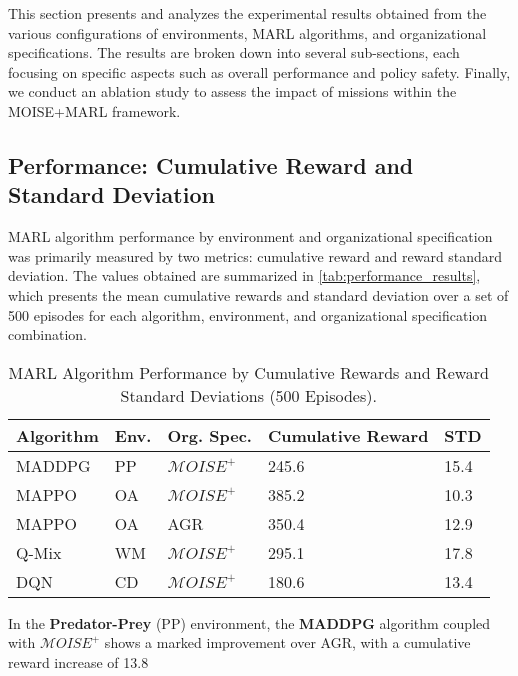 \documentclass[sigconf,anonymous]{aamas}
\begin{document}
This section presents and analyzes the experimental results obtained from the various configurations of environments, MARL algorithms, and organizational specifications. The results are broken down into several sub-sections, each focusing on specific aspects such as overall performance and policy safety. Finally, we conduct an ablation study to assess the impact of missions within the MOISE+MARL framework.

\subsection{Performance: Cumulative Reward and Standard Deviation}

MARL algorithm performance by environment and organizational specification was primarily measured by two metrics: cumulative reward and reward standard deviation. The values obtained are summarized in \autoref{tab:performance_results}, which presents the mean cumulative rewards and standard deviation over a set of 500 episodes for each algorithm, environment, and organizational specification combination.

\begin{table}[h!]
    \centering
    \caption{MARL Algorithm Performance by Cumulative Rewards and Reward Standard Deviations (500 Episodes).}
    \label{tab:performance_results}
    \small %
    \renewcommand{\arraystretch}{1.1}
    \begin{tabular}{p{1.4cm}p{0.5cm}p{1.1cm}p{1.4cm}p{1cm}}
        \hline
        \textbf{Algorithm} & \textbf{Env.} & \textbf{Org. Spec.} & \textbf{Cumulative Reward} & \textbf{STD} \\ \hline
        MADDPG & PP & $\mathcal{M}OISE^+$ & 245.6 & 15.4 \\
        MAPPO & OA & $\mathcal{M}OISE^+$ & 385.2 & 10.3 \\
        MAPPO & OA & AGR & 350.4 & 12.9 \\
        Q-Mix & WM & $\mathcal{M}OISE^+$ & 295.1 & 17.8 \\
        DQN & CD & $\mathcal{M}OISE^+$ & 180.6 & 13.4 \\ \hline
    \end{tabular}
\end{table}

In the \textbf{Predator-Prey} (PP) environment, the \textbf{MADDPG} algorithm coupled with $\mathcal{M}OISE^+$ shows a marked improvement over AGR, with a cumulative reward increase of 13.8%
\end{document}
